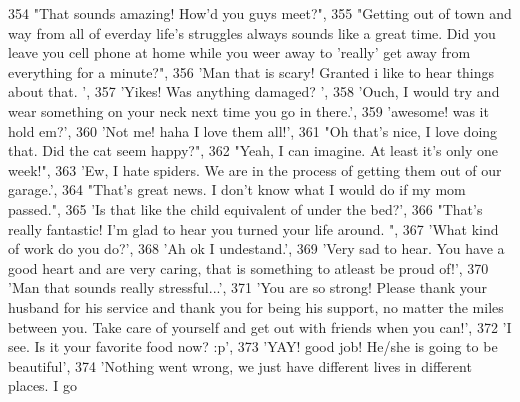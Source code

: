 \begin{DoxyCode}
354                             \textcolor{stringliteral}{"That sounds amazing! How'd you guys meet?"},
355                             \textcolor{stringliteral}{"Getting out of town and way from all of everday life's struggles always sounds
       like a great time.  Did you leave you cell phone at home while you weer away to 'really' get away from
       everything for a minute?"},
356                             \textcolor{stringliteral}{'Man that is scary! Granted i like to hear things about that. '},
357                             \textcolor{stringliteral}{'Yikes! Was anything damaged? '},
358                             \textcolor{stringliteral}{'Ouch, I would try and wear something on your neck next time you go in there.'},
359                             \textcolor{stringliteral}{'awesome! was it hold em?'},
360                             \textcolor{stringliteral}{'Not me! haha I love them all!'},
361                             \textcolor{stringliteral}{"Oh that's nice, I love doing that. Did the cat seem happy?"},
362                             \textcolor{stringliteral}{"Yeah, I can imagine. At least it's only one week!"},
363                             \textcolor{stringliteral}{'Ew, I hate spiders. We are in the process of getting them out of our garage.'},
364                             \textcolor{stringliteral}{"That's great news. I don't know what I would do if my mom passed."},
365                             \textcolor{stringliteral}{'Is that like the child equivalent of under the bed?'},
366                             \textcolor{stringliteral}{"That's really fantastic!  I'm glad to hear you turned your life around.  "},
367                             \textcolor{stringliteral}{'What kind of work do you do?'},
368                             \textcolor{stringliteral}{'Ah ok I undestand.'},
369                             \textcolor{stringliteral}{'Very sad to hear. You have a good heart and are very caring, that is something
       to atleast be proud of!'},
370                             \textcolor{stringliteral}{'Man that sounds really stressful...'},
371                             \textcolor{stringliteral}{'You are so strong!  Please thank your husband for his service and thank you
       for being his support, no matter the miles between you.  Take care of yourself and get out with friends when
       you can!'},
372                             \textcolor{stringliteral}{'I see. Is it your favorite food now? :p'},
373                             \textcolor{stringliteral}{'YAY! good job! He/she is going to be beautiful'},
374                             \textcolor{stringliteral}{'Nothing went wrong, we just have different lives in different places. I go
}
\end{DoxyCode}
